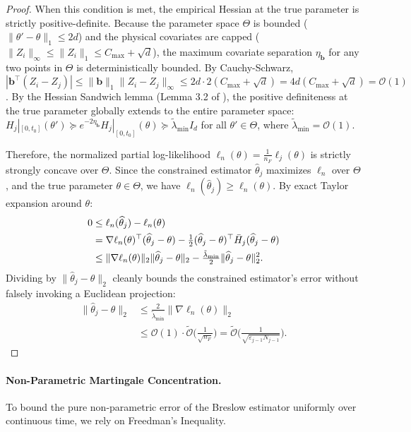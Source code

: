 \documentclass[letterpaper, 10 pt, conference]{IEEEconf}
\newcommand{\what}[1]{\widehat{#1}}
\begin{document}
\begin{proof}
    When this condition is met, the empirical Hessian at the true parameter is strictly positive-definite. Because the parameter space $\Theta$ is bounded ($\|\theta' - \theta\|_1 \le 2d$) and the physical covariates are capped ($\|Z_i\|_\infty \le \|Z_i\|_1 \le C_{\max} + \sqrt{d}$), the maximum covariate separation $\eta_{\mathbf{b}}$ for any two points in $\Theta$ is deterministically bounded. By Cauchy-Schwarz, $|\mathbf{b}^\top(Z_i - Z_j)| \le \|\mathbf{b}\|_1 \|Z_i - Z_j\|_\infty \le 2d \cdot 2(C_{\max} + \sqrt{d}) = 4d(C_{\max} + \sqrt{d}) = \mathcal{O}(1)$. By the Hessian Sandwich lemma (Lemma 3.2 of \cite{huang2013}), the positive definiteness at the true parameter globally extends to the entire parameter space: $H_j|_{[0, t_0]}(\theta') \succeq e^{-2\eta_{\mathbf{b}}} H_j|_{[0, t_0]}(\theta) \succeq \tilde{\lambda}_{\min} I_d$ for all $\theta' \in \Theta$, where $\tilde{\lambda}_{\min} = \mathcal{O}(1)$.

    Therefore, the normalized partial log-likelihood $\ell_n(\theta) = \frac{1}{n_F} \ell_j(\theta)$ is strictly strongly concave over $\Theta$. Since the constrained estimator $\what{\theta}_j$ maximizes $\ell_n$ over $\Theta$, and the true parameter $\theta \in \Theta$, we have $\ell_n(\what{\theta}_j) \ge \ell_n(\theta)$. By exact Taylor expansion around $\theta$:
    \begin{align}
        0 &\le \ell_n(\what{\theta}_j) - \ell_n(\theta) \notag \\
        &= \nabla \ell_n(\theta)^\top (\what{\theta}_j - \theta) - \tfrac{1}{2} (\what{\theta}_j - \theta)^\top \bar{H}_j (\what{\theta}_j - \theta) \notag \\
        &\le \|\nabla \ell_n(\theta)\|_2 \|\what{\theta}_j - \theta\|_2 - \tfrac{\tilde{\lambda}_{\min}}{2} \|\what{\theta}_j - \theta\|_2^2.
    \end{align}
    Dividing by $\|\what{\theta}_j - \theta\|_2$ cleanly bounds the constrained estimator's error without falsely invoking a Euclidean projection:
    \begin{align}
        \|\what{\theta}_j - \theta\|_2 &\le \frac{2}{\tilde{\lambda}_{\min}} \|\nabla \ell_n(\theta)\|_2 \\
        &\le \mathcal{O}(1) \cdot \widetilde{\mathcal{O}}\Bigg(\frac{1}{\sqrt{n_F}}\Bigg) = \widetilde{\mathcal{O}}\Bigg(\frac{1}{\sqrt{\varepsilon_{j-1} N_{j-1}}}\Bigg).
    \end{align}
\end{proof}

\paragraph{Non-Parametric Martingale Concentration.}
To bound the pure non-parametric error of the Breslow estimator uniformly over continuous time, we rely on Freedman's Inequality.
\end{document}
